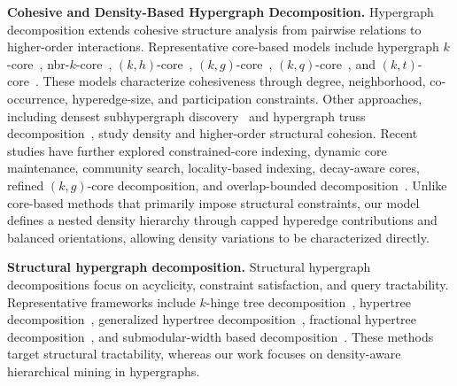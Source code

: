 \documentclass[twocolumn]{svjour3}
\newcommand{\stitle}[1]{\par\noindent\textbf{#1}}
\begin{document}
\stitle{Cohesive and Density-Based Hypergraph Decomposition.}
Hypergraph decomposition extends cohesive structure analysis from pairwise relations to higher-order interactions. Representative core-based models include hypergraph $k$-core~\cite{DBLP:conf/ipps/RamadanTP04,bianconi2024nature}, nbr-$k$-core~\cite{DBLP:journals/pvldb/ArafatKRG23,DBLP:journals/pacmmod/ZhangYWLZL25}, $(k,h)$-core~\cite{DBLP:conf/icde/LuoYLZ0023}, $(k,g)$-core~\cite{DBLP:conf/cikm/KimKLJ23}, $(k,q)$-core~\cite{DBLP:conf/cikm/Luo0000Y024,lee2023k}, and $(k,t)$-core~\cite{DBLP:journals/datamine/BuLS23}. These models characterize cohesiveness through degree, neighborhood, co-occurrence, hyperedge-size, and participation constraints. Other approaches, including densest subhypergraph discovery~\cite{DBLP:conf/cikm/HuWC17,huang2024densest} and hypergraph truss decomposition~\cite{DBLP:journals/pvldb/QinZLLYW25}, study density and higher-order structural cohesion.
Recent studies have further explored constrained-core indexing, dynamic core maintenance, community search, locality-based indexing, decay-aware cores, refined $(k,g)$-core decomposition, and overlap-bounded decomposition~\cite{DBLP:journals/vldb/LuoZYYLW25,DBLP:journals/www/LiuLZCY25,DBLP:conf/edbt/LiuLZ00Y25,DBLP:conf/edbt/KimKHKJK26,DBLP:conf/cikm/KimKKK25,DBLP:journals/kbs/KimKKKKLL26,DBLP:journals/vldb/LuoYZZYCLG26}. Unlike core-based methods that primarily impose structural constraints, our model defines a nested density hierarchy through capped hyperedge contributions and balanced orientations, allowing density variations to be characterized directly.

\stitle{Structural hypergraph decomposition.}
Structural hypergraph decompositions focus on acyclicity, constraint satisfaction, and query tractability.
Representative frameworks include $k$-hinge tree decomposition~\cite{jeavons1994structural}, hypertree decomposition~\cite{DBLP:journals/jcss/GottlobLS02}, generalized hypertree decomposition~\cite{DBLP:journals/jcss/CohenJG08}, fractional hypertree decomposition~\cite{DBLP:journals/corr/abs-1711-04506,gottlob2021complexity}, and submodular-width based decomposition~\cite{marx2013tractable}.
These methods target structural tractability, whereas our work focuses on density-aware hierarchical mining in hypergraphs.
\end{document}
